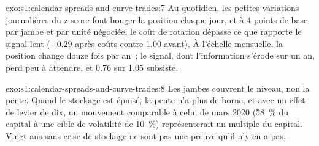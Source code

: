\begin{solution}{exo:s1:calendar-spreads-and-curve-trades:7}
Au quotidien, les petites variations journalières du z-score font bouger la position chaque jour, et à 4 points de base par jambe et par unité négociée, le coût de rotation dépasse ce que
rapporte le signal lent ($-0.29$ après coûts contre 1.00 avant). À l'échelle mensuelle, la position change douze fois par an~; le signal, dont l'information
s'érode sur un an, perd peu à attendre, et 0.76 sur 1.05 subsiste.
\end{solution}

\begin{solution}{exo:s1:calendar-spreads-and-curve-trades:8}
Les jambes couvrent le niveau, non la pente. Quand le stockage est épuisé, la pente n'a plus de borne, et avec un effet de levier de dix, un mouvement comparable à celui de mars 2020 (58~\% du capital
à une cible de volatilité de 10~\%) représenterait un multiple du capital. Vingt ans sans crise de stockage ne sont pas une preuve qu'il n'y en a pas.
\end{solution}

